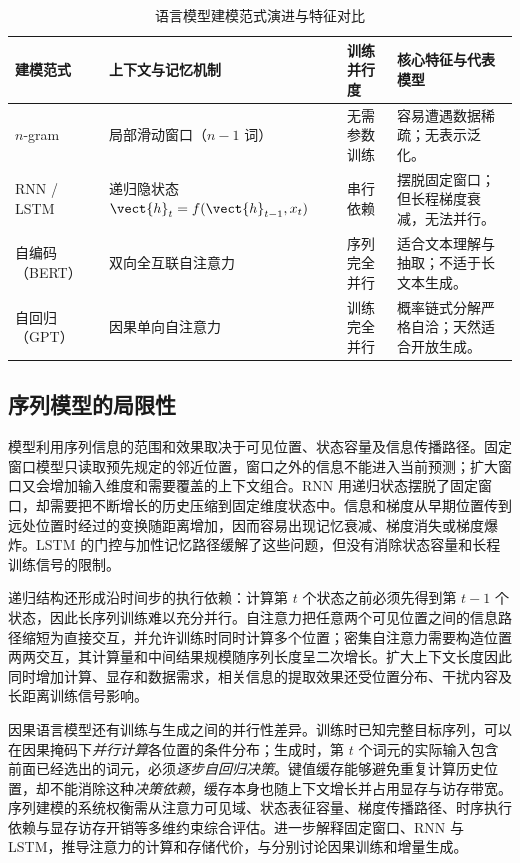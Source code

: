 \documentclass[../textbook.tex]{subfiles}
\begin{document}
\begin{table}[htbp]
\centering
\caption{语言模型建模范式演进与特征对比}\label{tab:intro-paradigms}
\begin{tabularx}{\linewidth}{@{}p{22mm}p{34mm}p{20mm}X@{}}
\toprule
建模范式 & 上下文与记忆机制 & 训练并行度 & 核心特征与代表模型 \\\midrule
$n$-gram & 局部滑动窗口（$n-1$ 词） & 无需参数训练 & 容易遭遇数据稀疏；无表示泛化。 \\
RNN / LSTM & 递归隐状态 $\vect{h}_t=f(\vect{h}_{t-1},x_t)$ & 串行依赖 & 摆脱固定窗口；但长程梯度衰减，无法并行。 \\
自编码（BERT） & 双向全互联自注意力 & 序列完全并行 & 适合文本理解与抽取；不适于长文本生成。 \\
自回归（GPT） & 因果单向自注意力 & 训练完全并行 & 概率链式分解严格自洽；天然适合开放生成。 \\
\bottomrule
\end{tabularx}
\end{table}

\subsection{序列模型的局限性}
模型利用序列信息的范围和效果取决于可见位置、状态容量及信息传播路径。固定窗口模型只读取预先规定的邻近位置，窗口之外的信息不能进入当前预测；扩大窗口又会增加输入维度和需要覆盖的上下文组合。RNN 用递归状态摆脱了固定窗口，却需要把不断增长的历史压缩到固定维度状态中。信息和梯度从早期位置传到远处位置时经过的变换随距离增加，因而容易出现记忆衰减、梯度消失或梯度爆炸。LSTM 的门控与加性记忆路径缓解了这些问题，但没有消除状态容量和长程训练信号的限制。

递归结构还形成沿时间步的执行依赖：计算第 $t$ 个状态之前必须先得到第 $t-1$ 个状态，因此长序列训练难以充分并行。自注意力把任意两个可见位置之间的信息路径缩短为直接交互，并允许训练时同时计算多个位置；密集自注意力需要构造位置两两交互，其计算量和中间结果规模随序列长度呈二次增长。扩大上下文长度因此同时增加计算、显存和数据需求，相关信息的提取效果还受位置分布、干扰内容及长距离训练信号影响。

因果语言模型还有训练与生成之间的并行性差异。训练时已知完整目标序列，可以在因果掩码下\emph{并行计算}各位置的条件分布；生成时，第 $t$ 个词元的实际输入包含前面已经选出的词元，必须\emph{逐步自回归决策}。键值缓存能够避免重复计算历史位置，却不能消除这种\emph{决策依赖}，缓存本身也随上下文增长并占用显存与访存带宽。序列建模的系统权衡需从注意力可见域、状态表征容量、梯度传播路径、时序执行依赖与显存访存开销等多维约束综合评估。进一步解释固定窗口、RNN 与 LSTM，推导注意力的计算和存储代价，与分别讨论因果训练和增量生成。
\end{document}
